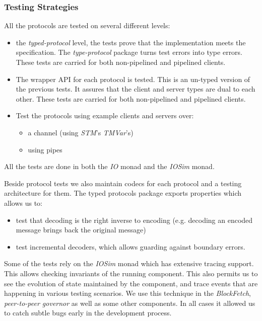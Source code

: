 \documentclass[11pt,a4paper]{article}
\begin{document}
\subsubsection{Testing Strategies}
\label{testing-strategies}

All the protocols are tested on several different levels:

\begin{itemize}
\item
  the \emph{typed-protocol} level, the tests prove that the
  implementation meets the specification. The \emph{type-protocol}
  package turns test errors into type errors. These tests are carried
  for both non-pipelined and pipelined clients.
\item
  The wrapper API for each protocol is tested. This is an un-typed
  version of the previous tests. It assures that the client and server
  types are dual to each other. These tests are carried for both
  non-pipelined and pipelined clients.
\item
  Test the protocols using example clients and servers over:

  \begin{itemize}
  \item
    a channel (using \emph{STM}'s \emph{TMVar}'s)
  \item
    using pipes
  \end{itemize}
\end{itemize}

All the tests are done in both the \emph{IO} monad and the \emph{IOSim}
monad.

Beside protocol tests we also maintain codecs for each protocol and a
testing architecture for them. The typed protocols package exports
properties which allows us to:

\begin{itemize}
\item
  test that decoding is the right inverse to encoding (e.g. decoding an
  encoded message brings back the original message)
\item
  test incremental decoders, which allows guarding against boundary
  errors.
\end{itemize}

Some of the tests rely on the \emph{IOSim} monad which has extensive
tracing support. This allows checking invariants of the running
component. This also permits us to see the evolution of state maintained
by the component, and trace events that are happening in various testing
scenarios. We use this technique in the \emph{BlockFetch},
\emph{peer-to-peer governor} as well as some other components. In all
cases it allowed us to catch subtle bugs early in the development
process.



\end{document}
